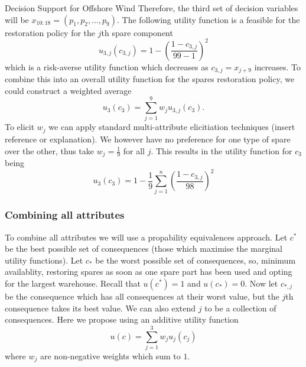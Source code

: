 \begin{chapter}{Decision Support for Offshore Wind \label{Ch:ds-for-ow}}
Therefore, the third set of decision variables will be $x_{10:18}  = (p_1, p_2, \ldots, p_9)$. The following utility function is a feasible for the restoration policy for the $j$th spare component
\begin{equation}
  u_{3,j}(c_{3,j}) = 1 - \left(\frac{1 - c_{3, j}}{99 - 1}\right)^2
\end{equation}
which is a risk-averse utility function which decreases as $c_{3, j} = x_{j+9}$ increases. To combine this into an overall utility function for the spares restoration policy, we could construct a weighted average
\begin{equation}
  u_3 (c_3) = \sum_{j = 1}^9 w_j u_{3,j}(c_3).
\end{equation}
To elicit $w_j$ we can apply standard multi-attribute elicitiation techniques (insert reference or explanation). We however have no preference for one type of spare over the other, thus take $w_j = \frac{1}{9}$ for all $j$. This results in the utility function for $c_3$ being
\begin{equation}
  u_3(c_3) = 1 - \frac{1}{9}\sum_{j=1}^n \left(\frac{1 - c_{3, j}}{98}\right)^2
\end{equation}

\subsubsection{Combining all attributes}
To combine all attributes we will use a propability equivalences approach. Let $c^{*}$ be the best possible set of consequences (those which maximise the marginal utility functions). Let $c_{*}$ be the worst possible set of consequences, so, minimum availablity, restoring spares as soon as one spare part has been used and opting for the largest warehouse. Recall that $u(c^{*}) = 1$ and $u(c_{*})= 0$. Now let $c_{*, j}$ be the consequence which has all consequences at their worst value, but the $j$th consequence takes its best value. We can also extend $j$ to be a collection of consequences.  Here we propose using an additive utility function
\begin{equation}
  u(c) = \sum_{j=1}^3 w_j u_j(c_j)
\end{equation}
where $w_j$ are non-negative weights which sum to $1$.


\end{chapter}
